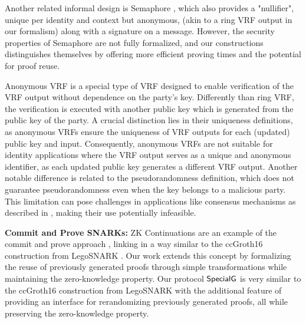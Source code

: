 Another related informal design is Semaphore \cite{Semaphore}, which also provides a "nullifier", unique per identity and context but anonymous, (akin to a ring VRF output in our formalism) along with a signature on a message. However, the security properties of Semaphore are not fully formalized, and our constructions distinguishes themselves by offering more efficient proving times and the potential for proof reuse.

Anonymous VRF \cite{anonymousVRF} is a special type of VRF designed to enable verification of the VRF output without dependence on the party's key.  Differently than ring VRF, the verification is executed with another public key which is generated from the public key of the party.  A crucial distinction lies in their  uniqueness definitions, as anonymous VRFs ensure the uniqueness of VRF outputs for each (updated) public key and input. Consequently, anonymous VRFs are not suitable for identity applications where the VRF output serves as a unique and anonymous identifier, as each updated public key generates a different VRF output.
Another notable difference is related to the pseudorandomness definition, which does not guarantee pseudorandomness even when the key belongs to a malicious party. This limitation can pose challenges in applications like consensus mechanisms as described in \cite{anonymousVRF}, making their use potentially infeasible.



\noindent\textbf{Commit and Prove SNARKs:} ZK Continuations are an example of the commit and prove approach \cite{LegoSNARK}, linking  in a way similar to the ccGroth16 construction from LegoSNARK \cite{LegoSNARK}. Our work extends this concept by formalizing the reuse of previously generated proofs through simple transformations while maintaining the zero-knowledge property. Our protocol $ {\mathsf{SpecialG}} $ is very similar to the ccGroth16 construction from LegoSNARK \cite{LegoSNARK} with the additional feature of providing an interface for rerandomizing previously generated proofs, all while preserving the zero-knowledge property.